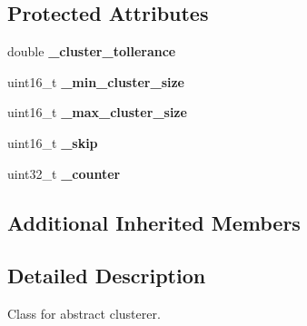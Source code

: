 \subsection*{Protected Attributes}
\begin{DoxyCompactItemize}
\item 
\hypertarget{classdepth__clustering_1_1AbstractClusterer_ae219f21aefc118debe4fc89dfb0af96a}{double {\bfseries \-\_\-cluster\-\_\-tollerance}}\label{classdepth__clustering_1_1AbstractClusterer_ae219f21aefc118debe4fc89dfb0af96a}

\item 
\hypertarget{classdepth__clustering_1_1AbstractClusterer_a7057f78c03aa9396850a61a92574f502}{uint16\-\_\-t {\bfseries \-\_\-min\-\_\-cluster\-\_\-size}}\label{classdepth__clustering_1_1AbstractClusterer_a7057f78c03aa9396850a61a92574f502}

\item 
\hypertarget{classdepth__clustering_1_1AbstractClusterer_ad11f0fd4ec9f7b83e9242d6fbbda0661}{uint16\-\_\-t {\bfseries \-\_\-max\-\_\-cluster\-\_\-size}}\label{classdepth__clustering_1_1AbstractClusterer_ad11f0fd4ec9f7b83e9242d6fbbda0661}

\item 
\hypertarget{classdepth__clustering_1_1AbstractClusterer_a4cc536460eb6ffb1d13cf2eba8039602}{uint16\-\_\-t {\bfseries \-\_\-skip}}\label{classdepth__clustering_1_1AbstractClusterer_a4cc536460eb6ffb1d13cf2eba8039602}

\item 
\hypertarget{classdepth__clustering_1_1AbstractClusterer_a951128009a13fde1a391289b359cdad2}{uint32\-\_\-t {\bfseries \-\_\-counter}}\label{classdepth__clustering_1_1AbstractClusterer_a951128009a13fde1a391289b359cdad2}

\end{DoxyCompactItemize}
\subsection*{Additional Inherited Members}


\subsection{Detailed Description}
Class for abstract clusterer. 

